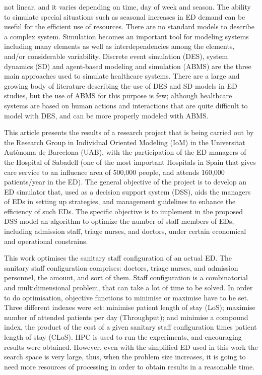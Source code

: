 \documentclass[11pt]{article} %
\begin{document}
not linear, and it varies depending on time, day of week and season. The ability to simulate special situations such as seasonal 
increases in ED demand can be useful for the efficient use of resources. There are no standard models to describe a complex system. 
Simulation becomes an important tool for modeling systems including many elements as well as interdependencies among the 
elements, and/or considerable variability. Discrete event simulation (DES), system dynamics (SD) and agent-based modeling and 
simulation (ABMS) are the three main approaches used to simulate healthcare systems. There are a large and  growing body of 
literature describing the use of DES and SD models in ED studies, but the use of ABMS for this purpose is few; although healthcare 
systems are based on human actions and interactions that are quite difficult to model with DES, and can be more properly modeled 
with ABMS. 

This article presents the results of a research project that is being carried out by the Research Group in Individual Oriented 
Modeling (IoM) in the Universitat Aut\`onoma de Barcelona (UAB), with the participation of the ED managers of the Hospital of 
Sabadell  (one of the most important Hospitals in Spain that gives care service to an influence area of 500,000 people, and attends 
160,000 patients/year in the ED). The general objective of the project is to develop an ED simulator that, used as a decision support 
system (DSS), aids the managers of EDs in setting up strategies, and management guidelines to enhance the efficiency of such EDs. 
The specific objective is to implement in the proposed DSS model an algorithm to optimize the number of staff members of EDs, 
including admission staff, triage nurses, and doctors, under certain economical and operational constrains. 

This work optimises the sanitary staff configuration of an actual ED. The sanitary staff configuration comprises: doctors, triage nurses, and admission personnel, the amount, and sort of them. Staff configuration is a combinatorial and multidimensional problem, that can take a lot of time to be solved. In order to do optimisation, objective functions to minimise or maximise have to be set. Three different indexes were set: minimise patient length of stay (LoS); maximise number of attended patients per day (Throughput); and minimise a compound index, the product of the cost of a given sanitary staff configuration times patient length of stay (CLoS). HPC is used to run the experiments, and encouraging results were obtained. However, even with the simplified ED used in this work the search space is very large, thus, when the problem size increases, it is going to need more resources of processing in order to obtain results in a reasonable time.
\end{document}
